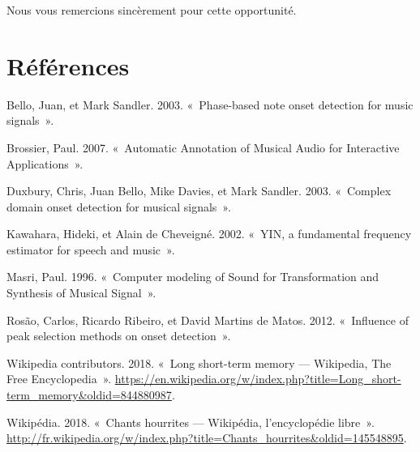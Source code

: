 \documentclass[french,]{article}
\begin{document}
Nous vous remercions sincèrement pour cette opportunité.

\pagebreak

\hypertarget{references}{%
\section*{Références}\label{references}}

\hypertarget{refs}{}
\leavevmode\hypertarget{ref-phase}{}%
Bello, Juan, et Mark Sandler. 2003. «~Phase-based note onset detection
for music signals~».

\leavevmode\hypertarget{ref-yinfft}{}%
Brossier, Paul. 2007. «~Automatic Annotation of Musical Audio for
Interactive Applications~».

\leavevmode\hypertarget{ref-complex}{}%
Duxbury, Chris, Juan Bello, Mike Davies, et Mark Sandler. 2003.
«~Complex domain onset detection for musical signals~».

\leavevmode\hypertarget{ref-yin}{}%
Kawahara, Hideki, et Alain de Cheveigné. 2002. «~YIN, a fundamental
frequency estimator for speech and music~».

\leavevmode\hypertarget{ref-hfc}{}%
Masri, Paul. 1996. «~Computer modeling of Sound for Transformation and
Synthesis of Musical Signal~».

\leavevmode\hypertarget{ref-ismir}{}%
Rosão, Carlos, Ricardo Ribeiro, et David Martins de Matos. 2012.
«~Influence of peak selection methods on onset detection~».

\leavevmode\hypertarget{ref-lstm}{}%
Wikipedia contributors. 2018. «~Long short-term memory --- Wikipedia,
The Free Encyclopedia~».
\url{https://en.wikipedia.org/w/index.php?title=Long_short-term_memory\&oldid=844880987}.

\leavevmode\hypertarget{ref-ougarit}{}%
Wikipédia. 2018. «~Chants hourrites --- Wikipédia, l'encyclopédie
libre~».
\url{http://fr.wikipedia.org/w/index.php?title=Chants_hourrites\&oldid=145548895}.
\end{document}
